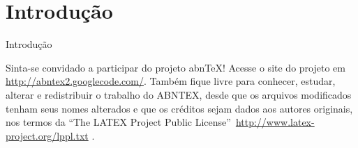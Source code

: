 \section{Introdução}\label{sec:introducao}
\begin{frame}{Introdução}
	
	Sinta-se convidado a participar do projeto abnTeX! Acesse o site do projeto 
	em
	\url{http://abntex2.googlecode.com/}. Também fique livre para conhecer,
	estudar, alterar e redistribuir o trabalho do ABNTEX, desde que os arquivos
	modificados tenham seus nomes alterados e que os créditos sejam dados aos
	autores originais, nos termos da ``The LATEX Project Public
	License''\ \url{http://www.latex-project.org/lppl.txt} \cite[p. 
	31]{abntex2modelo}.
	
\end{frame}
